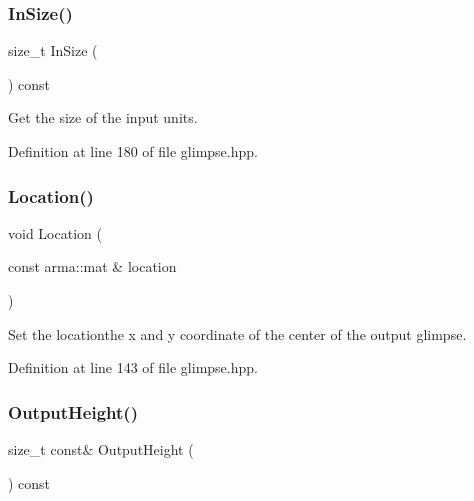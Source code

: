 \subsubsection{In\+Size()}
{\footnotesize\ttfamily size\+\_\+t In\+Size (\begin{DoxyParamCaption}{ }\end{DoxyParamCaption}) const\hspace{0.3cm}{\ttfamily [inline]}}



Get the size of the input units. 



Definition at line 180 of file glimpse.\+hpp.

\mbox{\label{classmlpack_1_1ann_1_1Glimpse_a8f32d484de0d3abca25a1aa77a7ab855}} 
\subsubsection{Location()}
{\footnotesize\ttfamily void Location (\begin{DoxyParamCaption}\item[{const arma\+::mat \&}]{location }\end{DoxyParamCaption})\hspace{0.3cm}{\ttfamily [inline]}}



Set the locationthe x and y coordinate of the center of the output glimpse. 



Definition at line 143 of file glimpse.\+hpp.

\mbox{\label{classmlpack_1_1ann_1_1Glimpse_a5ad7dbcaf1a622dafd897f79ab77890c}} 
\subsubsection{Output\+Height()\hspace{0.1cm}{\footnotesize\ttfamily [1/2]}}
{\footnotesize\ttfamily size\+\_\+t const\& Output\+Height (\begin{DoxyParamCaption}{ }\end{DoxyParamCaption}) const\hspace{0.3cm}{\ttfamily [inline]}}



